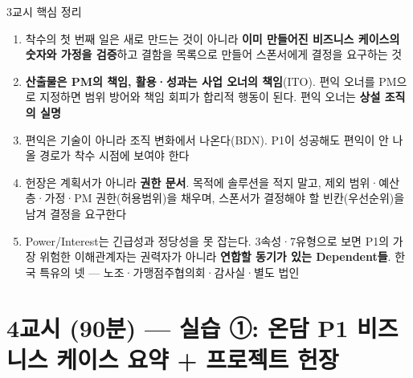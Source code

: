 \begin{frame}[allowframebreaks=1.0]{3교시 핵심 정리}
\small
\begin{enumerate}
\item\relax 착수의 첫 번째 일은 새로 만드는 것이 아니라 \textbf{이미 만들어진 비즈니스 케이스의 숫자와 가정을 검증}하고 결함을 목록으로 만들어 스폰서에게 결정을 요구하는 것
\item\relax \textbf{산출물은 PM의 책임, 활용·성과는 사업 오너의 책임}(ITO). 편익 오너를 PM으로 지정하면 범위 방어와 책임 회피가 합리적 행동이 된다. 편익 오너는 \textbf{상설 조직의 실명}
\item\relax 편익은 기술이 아니라 조직 변화에서 나온다(BDN). P1이 성공해도 편익이 안 나올 경로가 착수 시점에 보여야 한다
\item\relax 헌장은 계획서가 아니라 \textbf{권한 문서}. 목적에 솔루션을 적지 말고, 제외 범위·예산 층·가정·PM 권한(허용범위)을 채우며, 스폰서가 결정해야 할 빈칸(우선순위)을 남겨 결정을 요구한다
\item\relax Power/Interest는 긴급성과 정당성을 못 잡는다. 3속성·7유형으로 보면 P1의 가장 위험한 이해관계자는 권력자가 아니라 \textbf{연합할 동기가 있는 Dependent들}. 한국 특유의 넷 — 노조·가맹점주협의회·감사실·별도 법인
\end{enumerate}
\end{frame}

\section{4교시 (90분) — 실습 ①: 온담 P1 비즈니스 케이스 요약 + 프로젝트 헌장}

